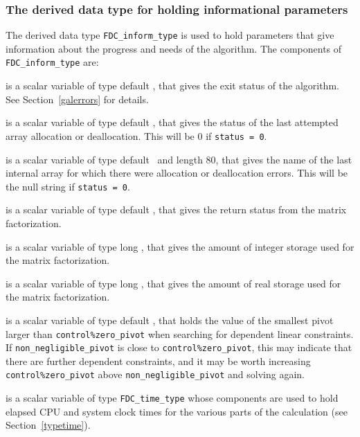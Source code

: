 \documentclass{galahad}
\newcommand{\packagename}{FDC}
\begin{document}

\subsubsection{The derived data type for holding informational
 parameters}\label{typeinform}
The derived data type
{\tt \packagename\_inform\_type}
is used to hold parameters that give information about the progress and needs
of the algorithm. The components of
{\tt \packagename\_inform\_type}
are:

\begin{description}

 is a scalar variable of type default \integer, that gives the
exit status of the algorithm.
See Section~\ref{galerrors}
for details.

 is a scalar variable of type default \integer, that gives
the status of the last attempted array allocation or deallocation.
This will be 0 if {\tt status = 0}.

 is a scalar variable of type default \character\
and length 80, that  gives the name of the last internal array
for which there were allocation or deallocation errors.
This will be the null string if {\tt status = 0}.

 is a scalar variable of type default \integer, that
gives the return status from the matrix factorization.

 is a scalar variable of type long
\integer, that gives the amount of integer storage used for the matrix
factorization.

 is a scalar variable of type long \integer,
that gives the amount of real storage used for the matrix factorization.

 is a scalar variable of type default \realdp,
that holds the value of the smallest pivot larger than
{\tt control\%zero\_pivot}
when searching for dependent linear constraints. If
{\tt non\_negligible\_pivot} is close to  {\tt control\%zero\_pivot},
this may indicate that there are further dependent constraints, and
it may be worth increasing {\tt control\%zero\_pivot} above
{\tt non\_negligible\_pivot} and solving again.

 is a scalar variable of type {\tt \packagename\_time\_type}
whose components are used to hold elapsed CPU and system clock
times for the various parts of the calculation (see Section~\ref{typetime}).


\end{description}
\end{document}
